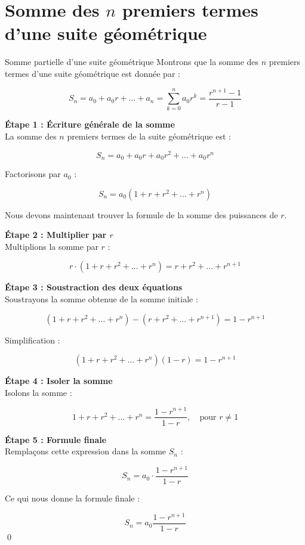 \documentclass{report}
\begin{document}
    \section{Somme des $n$ premiers termes d'une suite \textcolor{myb}{\textbf{géométrique}} }
    \begin{Preuve}{\hypertarget{Somme des n premiers termes géométrique}{Somme partielle d'une suite géométrique}}{}
            Montrons que la somme des $n$ premiers termes d'une suite géométrique est 
            donnée par :

            \[
            S_n = a_0 + a_0r + \dots + a_n  =  \sum\limits_{k=0}^{n} a_0r^k = 
            \dfrac{r^{n+1} - 1}{r - 1}
            \]

            \textbf{Étape 1 : Écriture générale de la somme} \\
            La somme des $n$ premiers termes de la suite géométrique est :

            \[
            S_n = a_0 + a_0 r + a_0 r^2 + \dots + a_0 r^n
            \]

            Factorisons par $a_0$ :

            \[
            S_n = a_0 \left( 1 + r + r^2 + \dots + r^n \right)
            \]

            Nous devons maintenant trouver la formule de la somme des puissances de $r$.

            \textbf{Étape 2 : Multiplier par $r$} \\
            Multiplions la somme par $r$ :

            \[
            r \cdot \left( 1 + r + r^2 + \dots + r^n \right) = r + r^2 + \dots + r^{n+1}
            \]

            \textbf{Étape 3 : Soustraction des deux équations} \\
            Soustrayons la somme obtenue de la somme initiale :

            \[
            \left( 1 + r + r^2 + \dots + r^n \right) - \left( r + r^2 + \dots + r^{n+1} 
            \right) = 1 - r^{n+1}
            \]

            Simplification :

            \[
            \left( 1 + r + r^2 + \dots + r^n \right) (1 - r) = 1 - r^{n+1}
            \]

            \textbf{Étape 4 : Isoler la somme} \\
            Isolons la somme :

            \[
            1 + r + r^2 + \dots + r^n = \dfrac{1 - r^{n+1}}{1 - r}, \quad \text{pour } 
            r \neq 1
            \]

            \textbf{Étape 5 : Formule finale} \\
            Remplaçons cette expression dans la somme $S_n$ :

            \[
            S_n = a_0 \cdot \dfrac{1 - r^{n+1}}{1 - r}
            \]

            Ce qui nous donne la formule finale :

            \[
                \boxed{S_n = a_0 \dfrac{1 - r^{n+1}}{1 -r}}
            \]
            \qed
        \end{Preuve}
\end{document}
